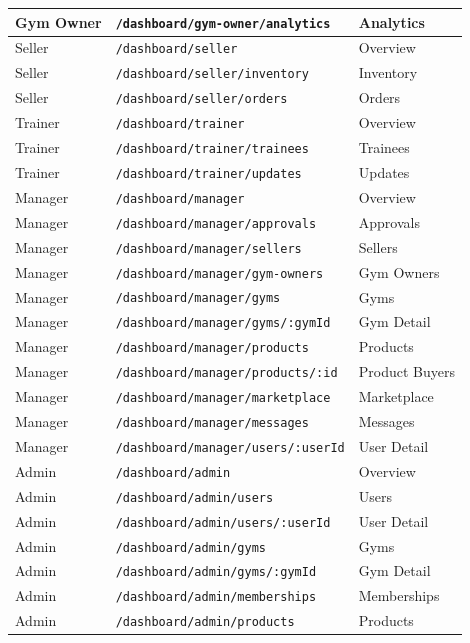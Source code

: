 \documentclass[a4paper,11pt]{article}
\begin{document}
{\begin{center}
\begin{tabular}{|l|l|l|}
Gym Owner & \texttt{/dashboard/gym-owner/analytics} & Analytics \\ \hline\hline
Seller & \texttt{/dashboard/seller} & Overview \\ \hline
Seller & \texttt{/dashboard/seller/inventory} & Inventory \\ \hline
Seller & \texttt{/dashboard/seller/orders} & Orders \\ \hline\hline
Trainer & \texttt{/dashboard/trainer} & Overview \\ \hline
Trainer & \texttt{/dashboard/trainer/trainees} & Trainees \\ \hline
Trainer & \texttt{/dashboard/trainer/updates} & Updates \\ \hline\hline
Manager & \texttt{/dashboard/manager} & Overview \\ \hline
Manager & \texttt{/dashboard/manager/approvals} & Approvals \\ \hline
Manager & \texttt{/dashboard/manager/sellers} & Sellers \\ \hline
Manager & \texttt{/dashboard/manager/gym-owners} & Gym Owners \\ \hline
Manager & \texttt{/dashboard/manager/gyms} & Gyms \\ \hline
Manager & \texttt{/dashboard/manager/gyms/:gymId} & Gym Detail \\ \hline
Manager & \texttt{/dashboard/manager/products} & Products \\ \hline
Manager & \texttt{/dashboard/manager/products/:id} & Product Buyers \\ \hline
Manager & \texttt{/dashboard/manager/marketplace} & Marketplace \\ \hline
Manager & \texttt{/dashboard/manager/messages} & Messages \\ \hline
Manager & \texttt{/dashboard/manager/users/:userId} & User Detail \\ \hline\hline
Admin & \texttt{/dashboard/admin} & Overview \\ \hline
Admin & \texttt{/dashboard/admin/users} & Users \\ \hline
Admin & \texttt{/dashboard/admin/users/:userId} & User Detail \\ \hline
Admin & \texttt{/dashboard/admin/gyms} & Gyms \\ \hline
Admin & \texttt{/dashboard/admin/gyms/:gymId} & Gym Detail \\ \hline
Admin & \texttt{/dashboard/admin/memberships} & Memberships \\ \hline
Admin & \texttt{/dashboard/admin/products} & Products \\ \hline

\end{tabular}
\end{center}}
\end{document}
